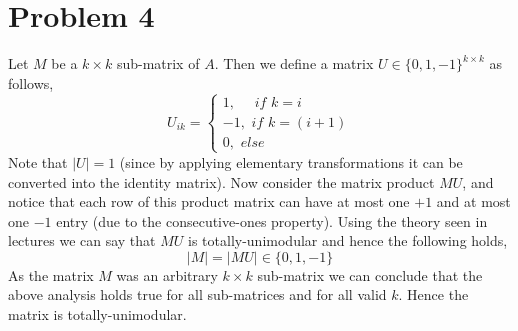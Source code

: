 \documentclass{article}
\numberwithin{equation}{section}
\begin{document}
\section{Problem 4} %
Let $M$ be a $k\times k$ sub-matrix of $A$. Then we define a matrix $U \in \{0, 1, -1\}^{k\times k}$ as follows, 
\begin{equation}
    U_{ik} = \begin{cases}
        1, \, \, \,\, \, \, \, \,  if \, \, k=i\\
        -1,\, \, if \,\, k=(i+1)\\
        0, \, \, else
    \end{cases}
\end{equation}
Note that $|U|=1$ (since by applying elementary transformations it can be converted into the identity matrix). Now consider the matrix product $MU$, and notice that each row of this product matrix can have at most one $+1$ and at most one $-1$ entry (due to the consecutive-ones property). Using the theory seen in lectures we can say that $MU$ is totally-unimodular and hence the following holds, 
\begin{equation}
    |M| = |MU| \in \{0, 1, -1\}
\end{equation}
As the matrix $M$ was an arbitrary $k\times k$ sub-matrix we can conclude that the above analysis holds true for all sub-matrices and for all valid $k$. Hence the matrix is totally-unimodular.\\\\
\end{document}
